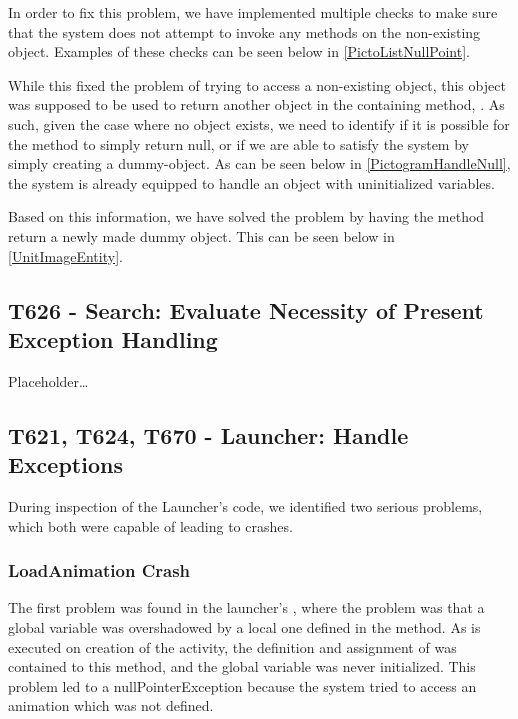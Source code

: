 In order to fix this problem, we have implemented multiple checks to make sure
that the system does not attempt to invoke any methods on the non-existing
object. Examples of these checks can be seen below in
\autoref{PictoListNullPoint}.

 
While this fixed the problem of trying to access a non-existing object, this
object was supposed to be used to return another object in the containing
method, .
As such, given the case where no object exists, we need to identify if it is
possible for the method to simply return null, or if we are able to satisfy the
system by simply creating a dummy-object. As can be seen below in
\autoref{PictogramHandleNull}, the system is already equipped to handle an
object with uninitialized variables.


Based on this information, we have solved the problem by having the
 method return a newly made dummy object. This can be seen below
in \autoref{UnitImageEntity}.


\subsection{T626 - Search: Evaluate Necessity of Present Exception Handling}
Placeholder\ldots

\subsection{T621, T624, T670 - Launcher: Handle Exceptions}
During inspection of the Launcher's code, we identified two serious problems,
which both were capable of leading to crashes.

\subsubsection{LoadAnimation Crash}
The first problem was found in the launcher's , where the
problem was that a global variable  was overshadowed by a
local one defined in the  method. As  is
executed on creation of the activity, the definition and assignment of
 was contained to this method, and the global variable was
never initialized. This problem led to a nullPointerException because the system
tried to access an animation which was not defined.\nl

